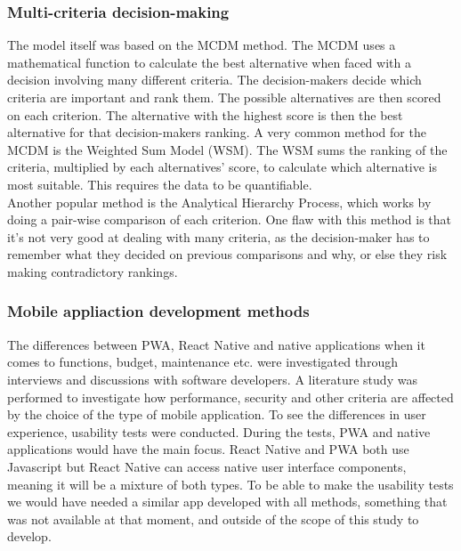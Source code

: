 \subsubsection{Multi-criteria decision-making}
The model itself was based on the MCDM method. The MCDM uses a mathematical function to calculate the best alternative when faced with a decision involving many different criteria. The decision-makers decide which criteria are important and rank them. The possible alternatives are then scored on each criterion. The alternative with the highest score is then the best alternative for that decision-makers ranking. A very common method for the MCDM is the Weighted Sum Model (WSM). The WSM sums the ranking of the criteria, multiplied by each alternatives’ score, to calculate which alternative is most suitable. This requires the data to be quantifiable.\\
Another popular method is the Analytical Hierarchy Process, which works by doing a pair-wise comparison of each criterion. One flaw with this method is that it’s not very good at dealing with many criteria, as the decision-maker has to remember what they decided on previous comparisons and why, or else they risk making contradictory rankings.
\subsubsection{Mobile appliaction development methods}
The differences between PWA, React Native and native applications when it comes to functions, budget, maintenance etc. were investigated through interviews and discussions with software developers. A literature study was performed to investigate how performance, security and other criteria are affected by the choice of the type of mobile application.
To see the differences in user experience, usability tests were conducted. During the tests, PWA and native applications would have the main focus. React Native and PWA both use Javascript but React Native can access native user interface components, meaning it will be a mixture of both types. To be able to make the usability tests we would have needed a similar app developed with all methods, something that was not available at that moment, and outside of the scope of this study to develop.  
